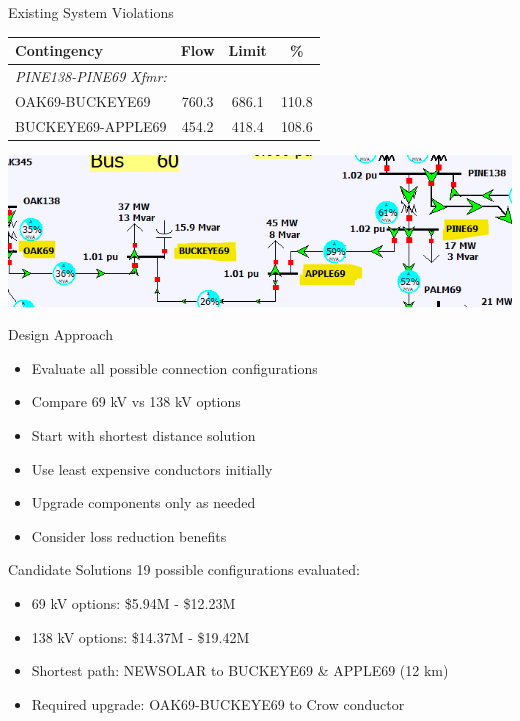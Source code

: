 \documentclass{beamer}
\begin{document}
	\begin{frame}{Existing System Violations}
		\begin{table}
			\centering
			\begin{tabular}{|l|c|c|c|}
				\hline
				\textbf{Contingency} & \textbf{Flow} & \textbf{Limit} & \textbf{\%} \\
				\hline
				\textit{PINE138-PINE69 Xfmr:} & & & \\
				OAK69-BUCKEYE69 & 760.3 & 686.1 & 110.8 \\
				BUCKEYE69-APPLE69 & 454.2 & 418.4 & 108.6 \\
				\hline
			\end{tabular}
		\end{table}
		\centering
		\includegraphics[width=0.7\linewidth]{figures/base_violations}
	\end{frame}
	
	\begin{frame}{Design Approach}
		\begin{itemize}
			\item Evaluate all possible connection configurations
			\item Compare 69 kV vs 138 kV options
			\item Start with shortest distance solution
			\item Use least expensive conductors initially
			\item Upgrade components only as needed
			\item Consider loss reduction benefits
		\end{itemize}
	\end{frame}
	
	\begin{frame}{Candidate Solutions}
		19 possible configurations evaluated:
		\begin{itemize}
			\item 69 kV options: \$5.94M - \$12.23M
			\item 138 kV options: \$14.37M - \$19.42M
			\item Shortest path: NEWSOLAR to BUCKEYE69 \& APPLE69 (12 km)
			\item Required upgrade: OAK69-BUCKEYE69 to Crow conductor
		\end{itemize}
	\end{frame}
	
\end{document}
